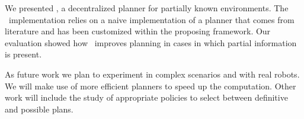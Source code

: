 We presented  \toolName, a  decentralized planner for partially known environments.
The \toolName\ implementation relies on a naive implementation of a planner that comes from literature and has been customized within the proposing framework.
Our evaluation showed how  \toolName\ improves planning in cases in which partial information is present.

As future work we plan to experiment in %
complex scenarios and with real robots. We will make use of 
more efficient planners to speed up the computation.
Other work will include the study of appropriate policies to select between definitive and possible plans.
